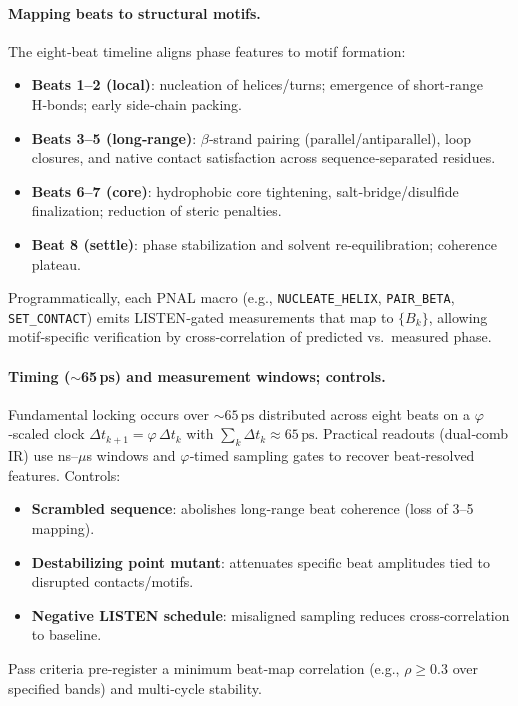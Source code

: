 \documentclass[12pt,a4paper]{article}
\begin{document}
\paragraph{Mapping beats to structural motifs.}
The eight‑beat timeline aligns phase features to motif formation:
\begin{itemize}
  \item \textbf{Beats 1–2 (local)}: nucleation of helices/turns; emergence of short‑range H‑bonds; early side‑chain packing.
  \item \textbf{Beats 3–5 (long‑range)}: $\beta$‑strand pairing (parallel/antiparallel), loop closures, and native contact satisfaction across sequence‑separated residues.
  \item \textbf{Beats 6–7 (core)}: hydrophobic core tightening, salt‑bridge/disulfide finalization; reduction of steric penalties.
  \item \textbf{Beat 8 (settle)}: phase stabilization and solvent re‑equilibration; coherence plateau.
\end{itemize}
Programmatically, each PNAL macro (e.g., \texttt{NUCLEATE\_HELIX}, \texttt{PAIR\_BETA}, \texttt{SET\_CONTACT}) emits LISTEN‑gated measurements that map to $\{B_k\}$, allowing motif‑specific verification by cross‑correlation of predicted vs.\ measured phase.

\paragraph{Timing (\texorpdfstring{$\sim$65\,ps}{~65 ps}) and measurement windows; controls.}
Fundamental locking occurs over $\sim 65\,\text{ps}$ distributed across eight beats on a $\varphi$‑scaled clock $\Delta t_{k+1} = \varphi\,\Delta t_k$ with $\sum_k \Delta t_k \approx 65\,\text{ps}$. Practical readouts (dual‑comb IR) use ns–$\mu$s windows and $\varphi$‑timed sampling gates to recover beat‑resolved features. Controls:
\begin{itemize}
  \item \textbf{Scrambled sequence}: abolishes long‑range beat coherence (loss of 3–5 mapping).
  \item \textbf{Destabilizing point mutant}: attenuates specific beat amplitudes tied to disrupted contacts/motifs.
  \item \textbf{Negative LISTEN schedule}: misaligned sampling reduces cross‑correlation to baseline.
\end{itemize}
Pass criteria pre‑register a minimum beat‑map correlation (e.g., $\rho \ge 0.3$ over specified bands) and multi‑cycle stability.
\end{document}
